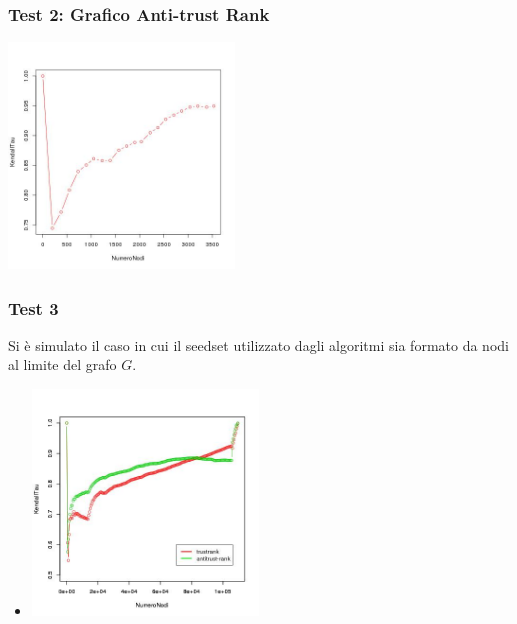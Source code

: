 \documentclass{beamer}
\begin{document}
  \begin{frame}
\frametitle{Test 2: Grafico Anti-trust Rank}
\begin{center}
 \includegraphics[height=6cm]{immagini/test2/antiTrustraktGoodNodesTestMode1_62}
\end{center}
\end{frame}
\begin{frame}
 \frametitle{Test 3}
 Si è  simulato il caso in cui il seedset  utilizzato dagli algoritmi sia formato da nodi al limite del grafo \(G\).
 \begin{itemize}
  \item<2-> \begin{center}
 \includegraphics[height=6cm]{immagini/test3/coplotTrustAnti_Mode1_set3776_62}
\end{center}
 \end{itemize}
\end{frame}
\end{document}
